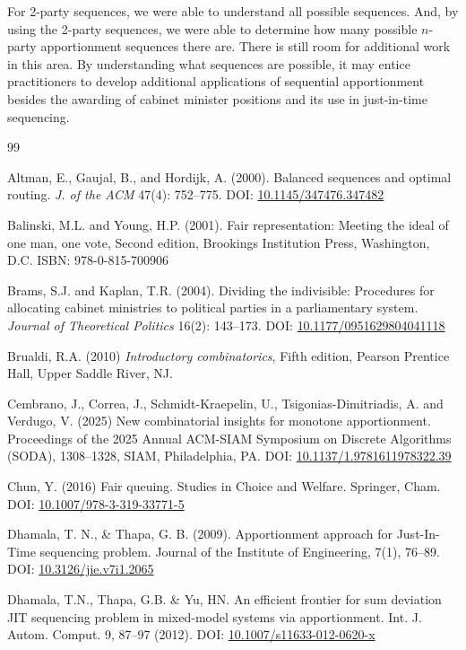 \documentclass[pdflatex,sn-mathphys-num]{sn-jnl}
\theoremstyle{thmstyleone}%
\theoremstyle{thmstyletwo}%
\theoremstyle{thmstylethree}%
\begin{document}
For 2-party sequences, we were able to understand all possible sequences.  And, by using the 2-party sequences, we were able to determine how many possible $n$-party apportionment sequences there are.  There is still room for additional work in this area.  By understanding what sequences are possible, it may entice practitioners to develop additional applications of sequential apportionment besides the awarding of cabinet minister positions and its use in just-in-time sequencing.

 

\begin{thebibliography}{99}

 Altman, E., Gaujal, B., and Hordijk, A. (2000). Balanced sequences and optimal routing. {\it J. of the ACM} 47(4): 752--775. DOI: \href{https://doi.org/10.1145/347476.347482}{10.1145/347476.347482}

 Balinski, M.L. and Young, H.P. (2001). Fair representation: Meeting the ideal of one man, one vote, Second edition, Brookings Institution Press, Washington, D.C. ISBN: 978-0-815-700906

 Brams, S.J. and Kaplan, T.R. (2004). Dividing the indivisible: Procedures for allocating cabinet ministries to political parties in a parliamentary system. {\it Journal of Theoretical Politics} 16(2): 143–173. DOI: \href{https://doi.org/10.1177/0951629804041118}{10.1177/0951629804041118}

 Brualdi, R.A. (2010) {\it Introductory combinatorics}, Fifth edition, Pearson Prentice Hall, Upper Saddle River, NJ.

  Cembrano, J.,  Correa, J., Schmidt-Kraepelin, U.,  Tsigonias-Dimitriadis, A. and Verdugo, V. (2025) New combinatorial insights for monotone apportionment. Proceedings of the 2025 Annual ACM-SIAM Symposium on {D}iscrete {A}lgorithms (SODA), {1308--1328}, SIAM, Philadelphia, PA. DOI: \href{https://doi.org/10.1137/1.9781611978322.39}{10.1137/1.9781611978322.39}
 
 Chun, Y. (2016) Fair queuing. Studies in Choice and Welfare. Springer, Cham. DOI: \href{https://doi.org/10.1007/978-3-319-33771-5}{10.1007/978-3-319-33771-5}

 Dhamala, T. N., \& Thapa, G. B. (2009). Apportionment approach for Just-In-Time sequencing problem. Journal of the Institute of Engineering, 7(1), 76–89. DOI: \href{https://doi.org/10.3126/jie.v7i1.2065}{10.3126/jie.v7i1.2065}

 Dhamala, T.N., Thapa, G.B. \& Yu, HN. An efficient frontier for sum deviation JIT sequencing problem in mixed-model systems via apportionment. Int. J. Autom. Comput. 9, 87–97 (2012). DOI: \href{https://doi.org/10.1007/s11633-012-0620-x}{10.1007/s11633-012-0620-x}


\end{thebibliography}
\end{document}
